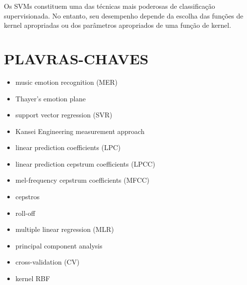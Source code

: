 \documentclass{article}
\begin{document}
Os SVMs constituem uma das técnicas mais poderosas de classificação supervisionada. No entanto, seu desempenho depende da escolha das funções de kernel apropriadas ou dos parâmetros apropriados de uma função de kernel.





\section{PLAVRAS-CHAVES}
\begin{itemize}
    \item music emotion recognition (MER)
    \item Thayer’s emotion plane
    \item support vector regression (SVR)
    \item Kansei Engineering measurement approach
    \item linear prediction coefficients (LPC)
    \item linear prediction cepstrum coefficients (LPCC)
    \item mel-frequency cepstrum coefficients (MFCC)
    \item cepstros
    \item roll-off
    \item multiple linear regression (MLR)
    \item principal component analysis
    \item cross-validation (CV)
    \item kernel RBF
\end{itemize}
\end{document}
